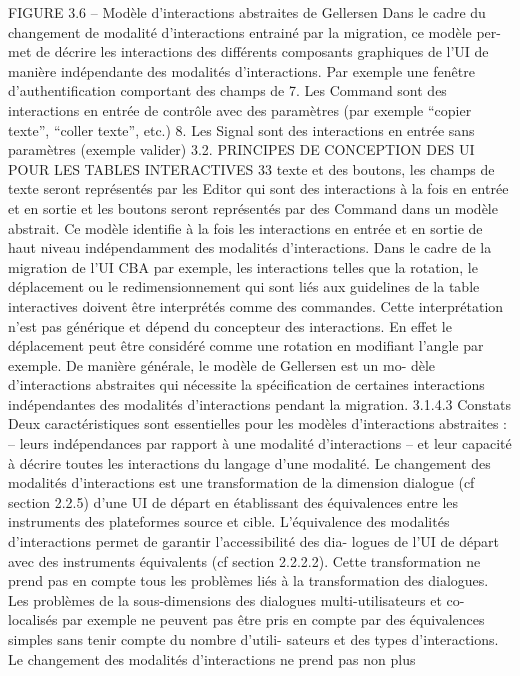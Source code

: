 \documentclass{article}
\begin{document}
 
FIGURE 3.6 – Modèle d’interactions abstraites de Gellersen
Dans le cadre du changement de modalité d’interactions entrainé par la migration, ce modèle per-
met de décrire les interactions des différents composants graphiques de l’UI de manière indépendante
des modalités d’interactions. Par exemple une fenêtre d’authentiﬁcation comportant des champs de
7. Les Command sont des interactions en entrée de contrôle avec des paramètres (par exemple “copier texte”, “coller
texte”, etc.)
8. Les Signal sont des interactions en entrée sans paramètres (exemple valider)
3.2. PRINCIPES DE CONCEPTION DES UI POUR LES TABLES INTERACTIVES
33
texte et des boutons, les champs de texte seront représentés par les Editor qui sont des interactions à la
fois en entrée et en sortie et les boutons seront représentés par des Command dans un modèle abstrait.
Ce modèle identiﬁe à la fois les interactions en entrée et en sortie de haut niveau indépendamment
des modalités d’interactions. Dans le cadre de la migration de l’UI CBA par exemple, les interactions
telles que la rotation, le déplacement ou le redimensionnement qui sont liés aux guidelines de la table
interactives doivent être interprétés comme des commandes. Cette interprétation n’est pas générique
et dépend du concepteur des interactions. En effet le déplacement peut être considéré comme une
rotation en modiﬁant l’angle par exemple. De manière générale, le modèle de Gellersen est un mo-
dèle d’interactions abstraites qui nécessite la spéciﬁcation de certaines interactions indépendantes des
modalités d’interactions pendant la migration.
3.1.4.3
Constats
Deux caractéristiques sont essentielles pour les modèles d’interactions abstraites :
– leurs indépendances par rapport à une modalité d’interactions
– et leur capacité à décrire toutes les interactions du langage d’une modalité.
Le changement des modalités d’interactions est une transformation de la dimension dialogue (cf
section 2.2.5) d’une UI de départ en établissant des équivalences entre les instruments des plateformes
source et cible. L’équivalence des modalités d’interactions permet de garantir l’accessibilité des dia-
logues de l’UI de départ avec des instruments équivalents (cf section 2.2.2.2). Cette transformation ne
prend pas en compte tous les problèmes liés à la transformation des dialogues.
Les problèmes de la sous-dimensions des dialogues multi-utilisateurs et co-localisés par exemple
ne peuvent pas être pris en compte par des équivalences simples sans tenir compte du nombre d’utili-
sateurs et des types d’interactions. Le changement des modalités d’interactions ne prend pas non plus
\end{document}
